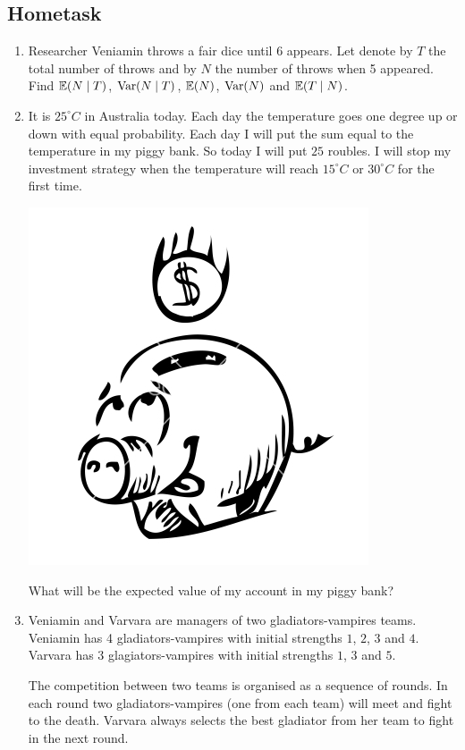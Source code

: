\documentclass[12pt, a4paper]{article}
\begin{document}
\subsection{Hometask}

\begin{enumerate}

\item Researcher Veniamin throws a fair dice until 6 appears. Let denote by $T$ the total number of throws and by $N$ the number of throws when 5 appeared. Find $\operatorname{\mathbb{E}}(N \mid T)$, $\operatorname{Var}(N \mid T)$, $\operatorname{\mathbb{E}}(N)$, $\operatorname{Var}(N)$ and $\operatorname{\mathbb{E}}(T \mid N)$.



\item It is $25^\circ C$ in Australia today. Each day the temperature goes one degree up or down with equal probability. 
Each day I will put the sum equal to the temperature in my piggy bank. 
So today I will put $25$ roubles. 
I will stop my investment strategy when the temperature will reach $15^\circ C$ or $30^\circ C$ for the first time.

\includegraphics[scale=0.25]{figures/piggy.png}

What will be the expected value of my account in my piggy bank?

\item Veniamin and Varvara are managers of two gladiators-vampires teams. Veniamin has 4 gladiators-vampires with initial strengths $1$, $2$, $3$ and $4$. Varvara has 3 glagiators-vampires with initial strengths $1$, $3$ and $5$.

The competition between two teams is organised as a sequence of rounds. In each round two gladiators-vampires (one from each team) will meet and fight to the death. Varvara always selects the best gladiator from her team to fight in the next round.


\end{enumerate}
\end{document}
